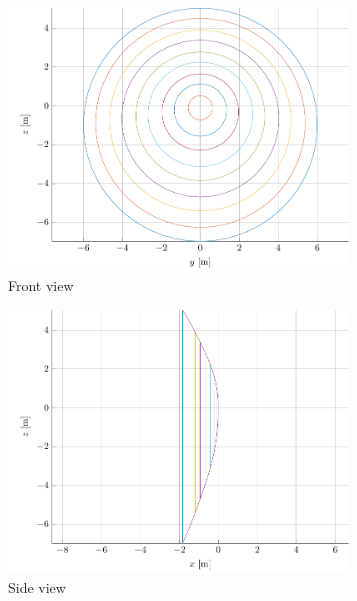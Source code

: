 \begin{figure}[h]
	\centering
	
	\begin{subfigure}[b]{0.49\textwidth}
		\includegraphics[width=0.99\textwidth]{./Figure/Aerodynamics/frontview.pdf}
		\caption{Front view}
		\label{fig:aeroshape.frontview}
	\end{subfigure}
	\begin{subfigure}[b]{0.49\textwidth}
		\includegraphics[width=0.99\textwidth]{./Figure/Aerodynamics/sideview.pdf}
		\caption{Side view}
		\label{fig:aeroshape.sideview}
	\end{subfigure}
	\begin{subfigure}[b]{0.49\textwidth}

\end{subfigure}
\end{figure}
